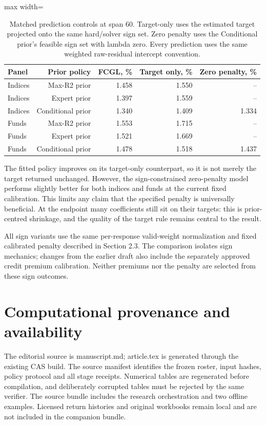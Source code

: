 \documentclass[a4paper,review]{cas-sc}
\begin{document}
\begin{table}[pos=htbp]
\centering
\small
\caption{Matched prediction controls at span 60. Target-only uses the estimated target projected onto the same hard/solver sign set. Zero penalty uses the Conditional prior's feasible sign set with lambda zero. Every prediction uses the same weighted raw-residual intercept convention.}
\begin{adjustbox}{max width=\linewidth}
\begin{tabular}{lrrrr}
\toprule
Panel & Prior policy & FCGL, \% & Target only, \% & Zero penalty, \% \\
\midrule
Indices & Max-R2 prior & 1.458 & 1.550 & -- \\
Indices & Expert prior & 1.397 & 1.559 & -- \\
Indices & Conditional prior & 1.340 & 1.409 & 1.334 \\
Funds & Max-R2 prior & 1.553 & 1.715 & -- \\
Funds & Expert prior & 1.521 & 1.669 & -- \\
Funds & Conditional prior & 1.478 & 1.518 & 1.437 \\
\bottomrule
\end{tabular}
\end{adjustbox}
\end{table}

\FloatBarrier
The fitted policy improves on its target-only counterpart, so it is not merely the target returned unchanged. However, the sign-constrained zero-penalty model performs slightly better for both indices and funds at the current fixed calibration. This limits any claim that the specified penalty is universally beneficial. At the endpoint many coefficients still sit on their targets: this is prior-centred shrinkage, and the quality of the target rule remains central to the result.

All sign variants use the same per-response valid-weight normalization and fixed calibrated penalty described in Section 2.3. The comparison isolates sign mechanics; changes from the earlier draft also include the separately approved credit premium calibration. Neither premiums nor the penalty are selected from these sign outcomes.

\FloatBarrier\clearpage\section*{Computational provenance and availability}

The editorial source is manuscript.md; article.tex is generated through the existing CAS build. The source manifest identifies the frozen roster, input hashes, policy protocol and all stage receipts. Numerical tables are regenerated before compilation, and deliberately corrupted tables must be rejected by the same verifier. The source bundle includes the research orchestration and two offline examples. Licensed return histories and original workbooks remain local and are not included in the companion bundle.
\end{document}
